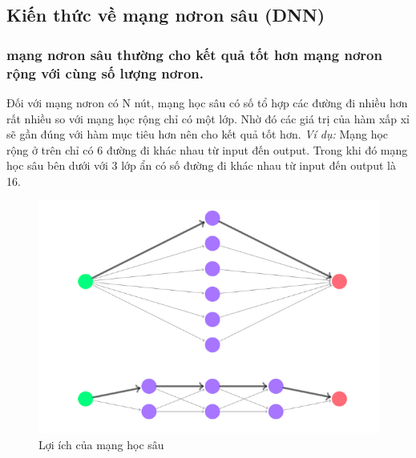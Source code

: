 \subsection{Kiến thức về mạng nơron sâu (DNN)}
\subsubsection{mạng nơron sâu thường cho kết quả tốt hơn mạng nơron rộng với cùng số lượng nơron.}

Đối với mạng nơron có N nút, mạng học sâu có số tổ hợp các đường đi nhiều hơn rất nhiều so với mạng học rộng chỉ có một lớp. Nhờ đó các giá trị của hàm xấp xỉ sẽ gần đúng với hàm mục tiêu hơn nên cho kết quả tốt hơn.
\textit{Ví dụ:} Mạng học rộng ở trên chỉ có 6 đường đi khác nhau từ input đến output. Trong khi đó mạng học sâu bên dưới với 3 lớp ẩn có số đường đi khác nhau từ input đến output là 16.
\begin{figure}[H]
	\begin{center}
		\includegraphics[scale=0.3]{images/theo5/deep-vs-narrow}
		\caption{Lợi ích của mạng học sâu}
	\end{center}
\end{figure} 


